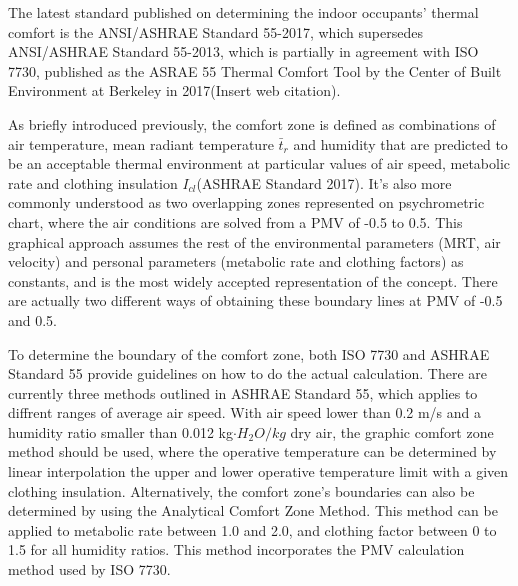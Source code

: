		The latest standard published on determining the indoor occupants' thermal comfort is the ANSI/ASHRAE Standard 55-2017, which supersedes ANSI/ASHRAE Standard 55-2013, which is partially in agreement with ISO 7730, published as the ASRAE 55 Thermal Comfort Tool by the Center of Built Environment at Berkeley in 2017(Insert web citation).

		As briefly introduced previously, the comfort zone is defined as combinations of air temperature, mean radiant temperature $\bar t_r$  and humidity that are predicted to be an acceptable thermal environment at particular values of air speed, metabolic rate and clothing insulation $I_{cl}$(ASHRAE Standard 2017). It's also more commonly understood as two overlapping zones represented on psychrometric chart, where the air conditions are solved from a PMV of -0.5 to 0.5. This graphical approach assumes the rest of the environmental parameters (MRT, air velocity) and personal parameters (metabolic rate and clothing factors) as constants, and is the most widely accepted representation of the concept. There are actually two different ways of obtaining these boundary lines at PMV of -0.5 and 0.5. %

		To determine the boundary of the comfort zone, both ISO 7730 and ASHRAE Standard 55 provide guidelines on how to do the actual calculation. There are currently three methods outlined in ASHRAE Standard 55, which applies to diffrent ranges of average air speed. With air speed lower than 0.2 m/s and a humidity ratio smaller than 0.012 kg$\cdot H_2O/kg$ dry air, the graphic comfort zone method should be used, where the operative temperature can be determined by linear interpolation the upper and lower operative temperature limit with a given clothing insulation. Alternatively, the comfort zone's boundaries can also be determined by using the Analytical Comfort Zone Method. This method can be applied to metabolic rate between 1.0 and 2.0, and clothing factor between 0 to 1.5 for all humidity ratios. This method incorporates the PMV calculation method used by ISO 7730.


